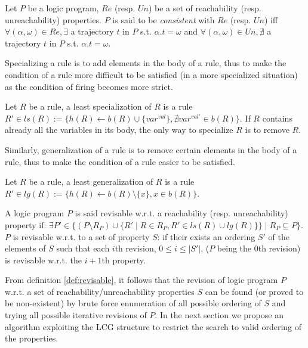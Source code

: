 \begin{definition}
Let $P$ be a logic program, $Re$ (resp. $Un$) be a set of reachability (resp. unreachability) properties.
$P$ is said to be {\em consistent} with $Re$ (resp. $Un$) iff
$\forall (\alpha,\omega) \in Re, \exists$ a trajectory $t$ in $P$ s.t. $\alpha.t=\omega$ and 
$\forall (\alpha,\omega) \in Un, \nexists$ a trajectory $t$ in $P$ s.t. $\alpha.t=\omega$.
\end{definition}

Specializing a rule is to add elements in the body of a rule,
thus to make the condition of a rule more difficult to be satisfied (in a more specialized situation) as the condition of firing becomes more strict.

\begin{definition}
	Let $R$ be a rule, a least specialization of $R$ is a rule $R' \in ls(R) := \{h(R) \leftarrow b(R) \cup \{var^{val}\}, \nexists var^{val'} \in b(R)\}$.
	If $R$ contains already all the variables in its body, the only way to specialize $R$ is to remove $R$.
\end{definition}

    Similarly, generalization of a rule is to remove certain elements in the body of a rule, thus to make the condition of a rule easier to be satisfied.

\begin{definition}
	Let $R$ be a rule, a least generalization of $R$ is a rule $R' \in lg(R) := \{h(R) \leftarrow b(R) \setminus \{x\},  x \in b(R)\}$.
\end{definition}

\begin{definition}[Revisable]\label{def:revisable}
	A logic program $P$ is said revisable w.r.t. a reachability (resp. unreachability) property if:
	$\exists P' \in \{(P \setminus R_P) \cup \{R' \mid R \in R_P, R' \in ls(R) \cup lg(R)\} \} \mid R_P \subseteq P\}$.
	$P$ is revisable w.r.t. to a set of property $S$:
	if their exists an ordering $S'$ of the elements of $S$ such that each $i$th revision, $0 \leq i \leq |S'|$, ($P$ being the $0$th revision) is revisable w.r.t. the $i+1$th property.
\end{definition} 

From definition \ref{def:revisable}, it follows that the revision of logic program $P$ w.r.t. a set of reachability/unreachability properties $S$ can be found (or proved to be non-existent) by brute force enumeration of all possible ordering of $S$ and trying all possible iterative revisions of $P$.
In the next section we propose an algorithm exploiting the LCG structure to restrict the search to valid ordering of the properties.
